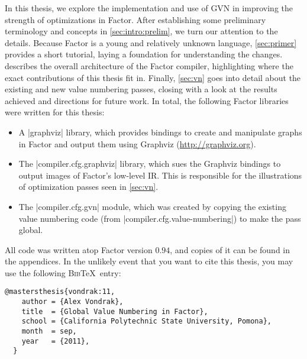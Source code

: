 In this thesis, we explore the implementation and use of \gls{GVN} in improving
the strength of optimizations in Factor.  After establishing some preliminary
terminology and concepts in \cref{sec:intro:prelim}, we turn our attention to
the details.  Because Factor is a young and relatively unknown language,
\cref{sec:primer} provides a short tutorial, laying a foundation for
understanding the changes.   describes the overall
architecture of the Factor compiler, highlighting where the exact contributions
of this thesis fit in.  Finally, \cref{sec:vn} goes into detail about the
existing and new value numbering passes, closing with a look at the results
achieved and directions for future work.  In total, the following Factor
libraries were written for this thesis:
\begin{itemize}
  \item A \factor|graphviz| library, which provides bindings to create and
        manipulate graphs in Factor and output them using Graphviz
        (\url{http://graphviz.org}).
  \item The \factor|compiler.cfg.graphviz| library, which sues the Graphviz
        bindings to output images of Factor's low-level \acrlong{IR}.  This is
        responsible for the illustrations of optimization passes seen in
        \cref{sec:vn}.
  \item The \factor|compiler.cfg.gvn| module, which was created by copying the
        existing value numbering code (from
        \factor|compiler.cfg.value-numbering|) to make the pass global.
\end{itemize}

All code was written atop Factor version $0.94$, and copies of it can be found
in the appendices.  In the unlikely event that you want to cite this thesis,
you may use the following \textsc{Bib}\TeX~entry:
\begin{Verbatim}[gobble=2,frame=single]
  @mastersthesis{vondrak:11,
    author = {Alex Vondrak},
    title  = {Global Value Numbering in Factor},
    school = {California Polytechnic State University, Pomona},
    month  = sep,
    year   = {2011},
  }
\end{Verbatim}


